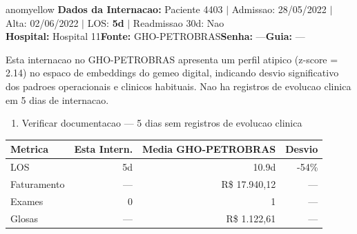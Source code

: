 \documentclass[a4paper,10pt]{article}
\begin{document}
\begin{anomalycard}[Internacao 4019 | GHO-PETROBRAS | MODERADO (z=2.14)]{anomyellow}
\textbf{Dados da Internacao:} Paciente 4403 $\mid$ Admissao: 28/05/2022 $\mid$ Alta: 02/06/2022 $\mid$ LOS: \textbf{5d} $\mid$ Readmissao 30d: Nao\\
\textbf{Hospital:} Hospital 11\quad\textbf{Fonte:} GHO-PETROBRAS\quad\textbf{Senha:} ---\quad\textbf{Guia:} ---\\
\vspace{2pt}\begin{tcolorbox}[colback=severityred!20,colframe=anomyellow,title={\textbf{Interpretacao de Negocio}},fonttitle=\bfseries\small,left=4pt,right=4pt,top=3pt,bottom=3pt]
{\small Esta internacao no GHO-PETROBRAS apresenta um perfil atipico (z-score = 2.14) no espaco de embeddings do gemeo digital, indicando desvio significativo dos padroes operacionais e clinicos habituais. Nao ha registros de evolucao clinica em 5 dias de internacao.}
\end{tcolorbox}
\begin{tcolorbox}[colback=severityyellow!30,colframe=anomorange,title={\textbf{Recomendacoes Especificas}},fonttitle=\bfseries\small,left=4pt,right=4pt,top=3pt,bottom=3pt]
\begin{enumerate}[nosep,leftmargin=16pt]
\item {\small Verificar documentacao --- 5 dias sem registros de evolucao clinica}
\end{enumerate}
\end{tcolorbox}
\begin{center}\begin{tabular}{l r r r}\toprule\textbf{Metrica} & \textbf{Esta Intern.} & \textbf{Media GHO-PETROBRAS} & \textbf{Desvio} \\\midrule
LOS & 5d & 10.9d & -54\% \\
Faturamento & --- & R\$ 17.940,12 & --- \\
Exames & 0 & 1 & --- \\
Glosas & --- & R\$ 1.122,61 & --- \\
\bottomrule\end{tabular}\end{center}


\end{anomalycard}
\end{document}
